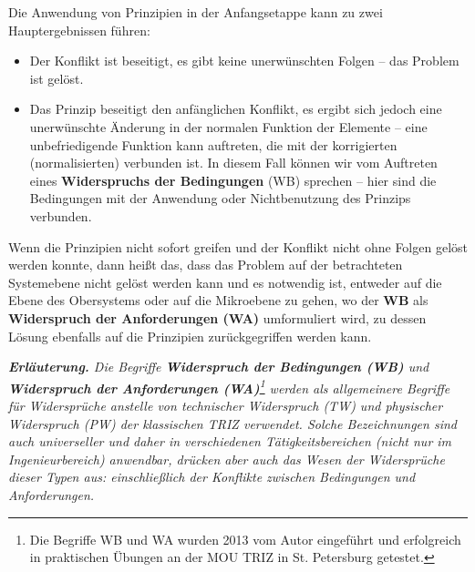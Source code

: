 \documentclass[11pt,a4paper]{article}
\begin{document}
Die Anwendung von Prinzipien in der Anfangsetappe kann zu zwei
Hauptergebnissen führen:
\begin{itemize}
\item[1.] Der Konflikt ist beseitigt, es gibt keine unerwünschten Folgen --
  das Problem ist gelöst. 
\item[2.] Das Prinzip beseitigt den anfänglichen Konflikt, es ergibt sich
  jedoch eine unerwünschte Änderung in der normalen Funktion der Elemente --
  eine unbefriedigende Funktion kann auftreten, die mit der korrigierten
  (normalisierten) verbunden ist. In diesem Fall können wir vom Auftreten
  eines \textbf{Widerspruchs der Bedingungen} (WB) sprechen -- hier sind die
  Bedingungen mit der Anwendung oder Nichtbenutzung des Prinzips verbunden.
\end{itemize}
Wenn die Prinzipien nicht sofort greifen und der Konflikt nicht ohne Folgen
gelöst werden konnte, dann heißt das, dass das Problem auf der betrachteten
Systemebene nicht gelöst werden kann und es notwendig ist, entweder auf die
Ebene des Obersystems oder auf die Mikroebene zu gehen, wo der \textbf{WB} als
\textbf{Widerspruch der Anforderungen (WA)} umformuliert wird, zu dessen
Lösung ebenfalls auf die Prinzipien zurückgegriffen werden kann.

\emph{\textbf{Erläuterung.} Die Begriffe \textbf{Widerspruch der Bedingungen
    (WB)} und \textbf{Widerspruch der Anforderungen (WA)}\footnote{Die
    Begriffe WB und WA wurden 2013 vom Autor eingeführt und erfolgreich in
    praktischen Übungen an der MOU TRIZ in St. Petersburg getestet.}  werden
  als allgemeinere Begriffe für Widersprüche anstelle von technischer
  Widerspruch (TW) und physischer Widerspruch (PW) der klassischen TRIZ
  verwendet.  Solche Bezeichnungen sind auch universeller und daher in
  verschiedenen Tätigkeitsbereichen (nicht nur im Ingenieurbereich) anwendbar,
  drücken aber auch das Wesen der Widersprüche dieser Typen aus:
  einschließlich der Konflikte zwischen Bedingungen und Anforderungen.}
\end{document}

